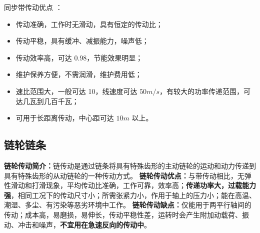 \documentclass[UTF8]{article} %
\begin{document}
同步带传动优点 ：
\begin{itemize}
  \item 传动准确，工作时无滑动，具有恒定的传动比；
	\item 传动平稳，具有缓冲、减振能力，噪声低；
	\item 传动效率高，可达 0.98，节能效果明显；
	\item 维护保养方便，不需润滑，维护费用低；
	\item 速比范围大，一般可达 10，线速度可达 $50m/s$，有较大的功率传递范围，可达几瓦到几百千瓦；
	\item 可用于长距离传动，中心距可达 $10m$ 以上。
\end{itemize}
	
\subsection{链轮链条}
\textbf{链轮传动简介：}链传动是通过链条将具有特殊齿形的主动链轮的运动和动力传递到具有特殊齿形的从动链轮的一种传动方式。
\textbf{链轮传动优点：}与带传动相比，无弹性滑动和打滑现象，平均传动比准确，工作可靠，效率高；\textbf{传递功率大，过载能力强}，相同工况下的传动尺寸小；所需张紧力小，作用于轴上的压力小；能在高温、潮湿、多尘、有污染等恶劣环境中工作。
\textbf{链轮传动缺点：}仅能用于两平行轴间的传动；成本高，易磨损，易伸长，传动平稳性差，运转时会产生附加动载荷、振动、冲击和噪声，\textbf{不宜用在急速反向的传动中}。
\end{document}
